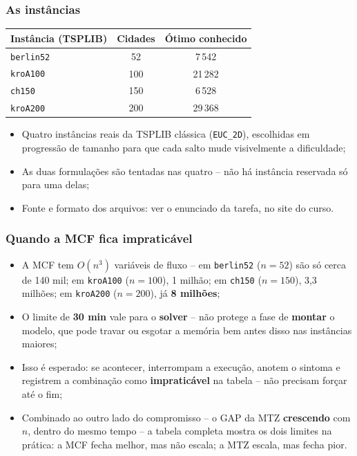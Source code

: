 \documentclass[fleqn]{beamer}
\begin{document}
\begin{frame}
	\frametitle{As instâncias}
	\begin{center}
	\footnotesize
	\begin{tabular}{lcc}
		\toprule
		Instância (TSPLIB) & Cidades & Ótimo conhecido \\
		\midrule
		\texttt{berlin52} & 52 & 7\,542 \\
		\texttt{kroA100} & 100 & 21\,282 \\
		\texttt{ch150} & 150 & 6\,528 \\
		\texttt{kroA200} & 200 & 29\,368 \\
		\bottomrule
	\end{tabular}
	\end{center}
	\begin{itemize}
		\item Quatro instâncias reais da TSPLIB clássica
			(\texttt{EUC\_2D}), escolhidas em progressão de tamanho para
			que cada salto mude visivelmente a dificuldade;
		\item As duas formulações são tentadas nas quatro -- não há
			instância reservada só para uma delas;
		\item Fonte e formato dos arquivos: ver o enunciado da tarefa, no
			site do curso.
	\end{itemize}
\end{frame}

\begin{frame}
	\frametitle{Quando a MCF fica impraticável}
	\begin{itemize}
		\item A MCF tem $O(n^3)$ variáveis de fluxo -- em \texttt{berlin52}
			($n=52$) são só cerca de 140 mil; em \texttt{kroA100}
			($n=100$), 1 milhão; em \texttt{ch150} ($n=150$), 3,3
			milhões; em \texttt{kroA200} ($n=200$), já \textbf{8
			milhões};
		\item O limite de \textbf{30 min} vale para o \textbf{solver} --
			não protege a fase de \textbf{montar} o modelo, que pode
			travar ou esgotar a memória bem antes disso nas instâncias
			maiores;
		\item Isso é esperado: se acontecer, interrompam a execução,
			anotem o sintoma e registrem a combinação como
			\textbf{impraticável} na tabela -- não precisam forçar até o
			fim;
		\item Combinado ao outro lado do compromisso -- o GAP da MTZ
			\textbf{crescendo} com $n$, dentro do mesmo tempo -- a tabela
			completa mostra os dois limites na prática: a MCF fecha
			melhor, mas não escala; a MTZ escala, mas fecha pior.
	\end{itemize}
\end{frame}
\end{document}
